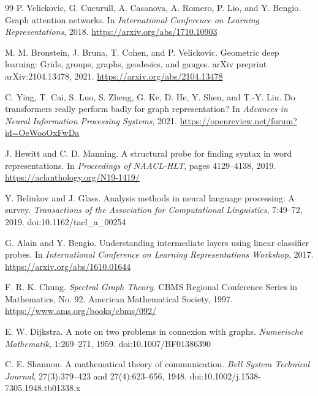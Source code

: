 \documentclass[11pt]{article}
\begin{document}
\begin{thebibliography}{99}
P. Velickovic, G. Cucurull, A. Casanova, A. Romero, P. Lio, and Y. Bengio.
\newblock Graph attention networks.
\newblock In \emph{International Conference on Learning Representations}, 2018.
\newblock \url{https://arxiv.org/abs/1710.10903}

M. M. Bronstein, J. Bruna, T. Cohen, and P. Velickovic.
\newblock Geometric deep learning: Grids, groups, graphs, geodesics, and gauges.
\newblock arXiv preprint arXiv:2104.13478, 2021.
\newblock \url{https://arxiv.org/abs/2104.13478}

C. Ying, T. Cai, S. Luo, S. Zheng, G. Ke, D. He, Y. Shen, and T.-Y. Liu.
\newblock Do transformers really perform badly for graph representation?
\newblock In \emph{Advances in Neural Information Processing Systems}, 2021.
\newblock \url{https://openreview.net/forum?id=OeWooOxFwDa}

J. Hewitt and C. D. Manning.
\newblock A structural probe for finding syntax in word representations.
\newblock In \emph{Proceedings of NAACL-HLT}, pages 4129--4138, 2019.
\newblock \url{https://aclanthology.org/N19-1419/}

Y. Belinkov and J. Glass.
\newblock Analysis methods in neural language processing: A survey.
\newblock \emph{Transactions of the Association for Computational Linguistics}, 7:49--72, 2019.
\newblock doi:10.1162/tacl\_a\_00254

G. Alain and Y. Bengio.
\newblock Understanding intermediate layers using linear classifier probes.
\newblock In \emph{International Conference on Learning Representations Workshop}, 2017.
\newblock \url{https://arxiv.org/abs/1610.01644}

F. R. K. Chung.
\newblock \emph{Spectral Graph Theory}.
\newblock CBMS Regional Conference Series in Mathematics, No. 92. American Mathematical Society, 1997.
\newblock \url{https://www.ams.org/books/cbms/092/}

E. W. Dijkstra.
\newblock A note on two problems in connexion with graphs.
\newblock \emph{Numerische Mathematik}, 1:269--271, 1959.
\newblock doi:10.1007/BF01386390

C. E. Shannon.
\newblock A mathematical theory of communication.
\newblock \emph{Bell System Technical Journal}, 27(3):379--423 and 27(4):623--656, 1948.
\newblock doi:10.1002/j.1538-7305.1948.tb01338.x


\end{thebibliography}
\end{document}
